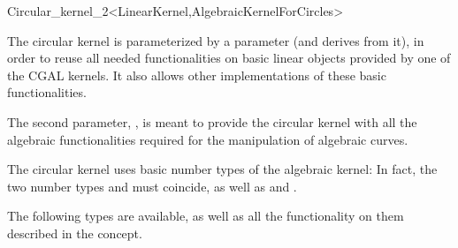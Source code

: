 \begin{ccRefClass}{Circular_kernel_2<LinearKernel,AlgebraicKernelForCircles>}

\ccDefinition


\ccIsModel


\ccParameters

The circular kernel is parameterized by a  parameter
(and derives from it), in order to reuse all needed functionalities on
basic linear objects provided by one of the CGAL kernels. It also
allows other implementations of these basic functionalities.

The second parameter, , is meant to provide the
circular kernel with all the algebraic functionalities required for the
manipulation of algebraic curves. 

\ccInheritsFrom


\ccTypes

\ccThreeToTwo

The circular kernel uses basic number types of the algebraic kernel:
In fact, the two number types  and
 must coincide, as well as
 and .

The following types are available, as well as all the functionality on
them described in the  concept. 

\ccGlue
{}
\ccGlue
{}

\ccSeeAlso

\\

\end{ccRefClass}
